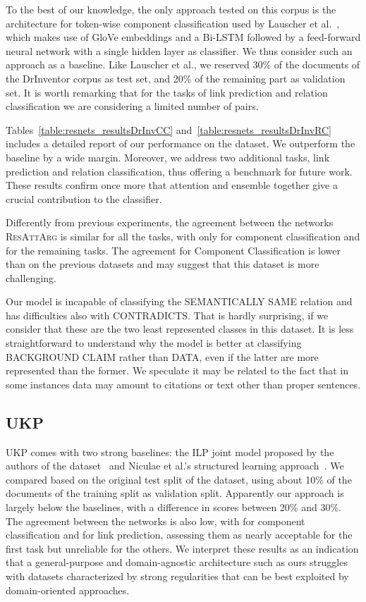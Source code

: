\documentclass[journal]{IEEEtran}
\begin{document}
To the best of our knowledge, the only approach tested on this corpus is the architecture for token-wise component classification used by Lauscher et al.~\cite{D18-1370}, which makes use of GloVe embeddings and a Bi-LSTM followed by a feed-forward neural network with a single hidden layer as classifier. We thus consider such an approach as a baseline.
Like Lauscher et al., we reserved 30\% of the documents of the DrInventor corpus as test set, and 20\% of the remaining part as validation set. It is worth remarking that for the tasks of link prediction and relation classification we are considering a limited number of pairs.

Tables~\ref{table:resnets_resultsDrInvCC} and~\ref{table:resnets_resultsDrInvRC} includes a detailed report of our performance on the dataset.
We  outperform the baseline by a wide margin. Moreover, we address two additional tasks, link prediction and relation classification, thus offering a benchmark for future work.
These results confirm once more that attention and ensemble together give a crucial contribution to the classifier.

Differently from previous experiments, the agreement between the networks \textsc{ResAttArg} is similar for all the tasks, with only  for component classification and  for the remaining tasks. The agreement for Component Classification is lower than on the previous datasets and may suggest that this dataset is more challenging.

Our model is incapable of classifying the SEMANTICALLY SAME relation and has difficulties also with CONTRADICTS. That is hardly surprising, if we consider that these are the two least represented classes in this dataset. It is less straightforward to understand why the model is better at classifying BACKGROUND CLAIM rather than DATA, even if the latter are more represented than the former. We speculate it may be related to the fact that in some instances data may amount to citations or text other than proper sentences. 



\subsection{UKP}



UKP  comes with two strong baselines: the ILP joint model proposed by the authors of the dataset~\cite{stab2017parsing} and Niculae et al.'s structured learning approach~\cite{DBLP:conf/acl/NiculaePC17}. We compared based on the original test split of the dataset, using about 10\% of the documents of the training split as validation split.
Apparently our approach is largely below the baselines, with a difference in  scores between 20\% and 30\%. The agreement between the networks is also low, with  for component classification and  for link prediction, assessing them as nearly acceptable for the first task but unreliable for the others.
We interpret these results as an indication that a general-purpose and domain-agnostic architecture such as ours struggles with datasets characterized by strong regularities that can be best exploited by domain-oriented approaches. 
\end{document}
